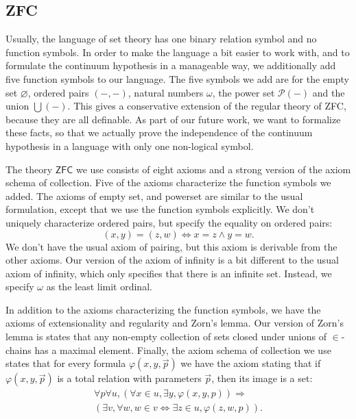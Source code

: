 \documentclass[sigplan,10pt,review, autoref,anonymous]{acmart}
\newcommand{\ZFC}{\mathsf{ZFC}}
\theoremstyle{definition}
\begin{document}
\subsection{ZFC}
\label{subsection:fol:zfc}

Usually, the language of set theory has one binary relation symbol and no function symbols.
In order to make the language a bit easier to work with, and to formulate the continuum hypothesis in a manageable way, we additionally add five function symbols to our language.
The five symbols we add are for the empty set \(\varnothing\), ordered pairs \(({-},{-})\), natural numbers \(\omega\), the power set \(\mathcal{P}({-})\) and the union \(\bigcup({-})\).
This gives a conservative extension of the regular theory of ZFC, because they are all definable.
As part of our future work, we want to formalize these facts, so that we actually prove the independence of the continuum hypothesis in a language with only one non-logical symbol.

The theory \(\ZFC\) we use consists of eight axioms and a strong version of the axiom schema of collection.
Five of the axioms characterize the function symbols we added.
The axioms of empty set, and powerset are similar to the usual formulation, except that we use the function symbols explicitly.
We don't uniquely characterize ordered pairs, but specify the equality on ordered pairs:
\[(x,y)=(z,w) \iff x = z \wedge y = w.\]
We don't have the usual axiom of pairing, but this axiom is derivable from the other axioms.
Our version of the axiom of infinity is a bit different to the usual axiom of infinity, which only specifies that there is an infinite set. Instead, we specify $\omega$ as the least limit ordinal.

In addition to the axioms characterizing the function symbols, we have the axioms of extensionality and regularity and Zorn's lemma.
Our version of Zorn's lemma is states that any non-empty collection of sets closed under unions of $\in$-chains has a maximal element.
Finally, the axiom schema of collection we use states that for every formula \(\varphi(x,y,\vec p)\) we have the axiom stating that if \(\varphi(x,y,\vec p)\) is a total relation with parameters \(\vec p\), then its image is a set:
\begin{gather*}
\forall p \forall u, (\forall x \in u, \exists y, \varphi(x,y,p)) \Rightarrow\\
(\exists v, \forall w, w \in v \iff \exists z \in u, \varphi(z,w,p)).
\end{gather*}
\end{document}
